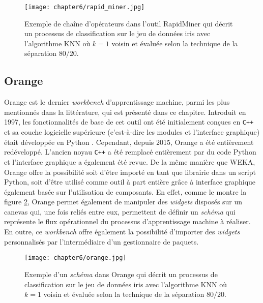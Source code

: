 \begin{figure}[H]
	\centering
	\texttt{[image: chapter6/rapid\_miner.jpg]}
        \caption{Exemple de chaîne d'opérateurs dans l'outil RapidMiner qui décrit un processus de classification sur le jeu de données iris avec l'algorithme \acs{KNN} où $k=1$ voisin et évaluée selon la technique de la séparation $80/20$.}
	\label{fig:rapid_miner}
\end{figure}

\subsection{Orange}

Orange est le dernier \textit{workbench} d'apprentissage machine, parmi les plus mentionnés dans la littérature, qui est présenté dans ce chapitre. Introduit en 1997, les fonctionnalités de base de cet outil ont été initialement conçues en \verb!C++! et sa couche logicielle supérieure (c'est-à-dire les modules et l'interface graphique) était développée en Python \citep{Demsar2004,Demsar2013}. Cependant, depuis 2015, Orange a été entièrement redéveloppé. L'ancien noyau \verb!C++! a été remplacé entièrement par du code Python et l'interface graphique a également été revue. De la même manière que \acs{WEKA}, Orange offre la possibilité soit d'être importé en tant que librairie dans un script Python, soit d'être utilisé comme outil à part entière grâce à interface graphique également basée sur l'utilisation de composants. En effet, comme le montre la figure \ref{fig:orange}, Orange permet également de manipuler des \emph{widgets} disposés sur un canevas qui, une fois reliés entre eux, permettent de définir un \emph{schéma} qui représente le flux opérationnel du processus d'apprentissage machine à réaliser. En outre, ce \textit{workbench} offre également la possibilité d'importer des \emph{widgets} personnalisés par l'intermédiaire d'un gestionnaire de paquets.

\begin{figure}[H]
	\centering
	\texttt{[image: chapter6/orange.jpg]}
        \caption{Exemple d'un \emph{schéma} dans Orange qui décrit un processus de classification sur le jeu de données iris avec l'algorithme \acs{KNN} où $k=1$ voisin et évaluée selon la technique de la séparation $80/20$.}
	\label{fig:orange}
\end{figure}

